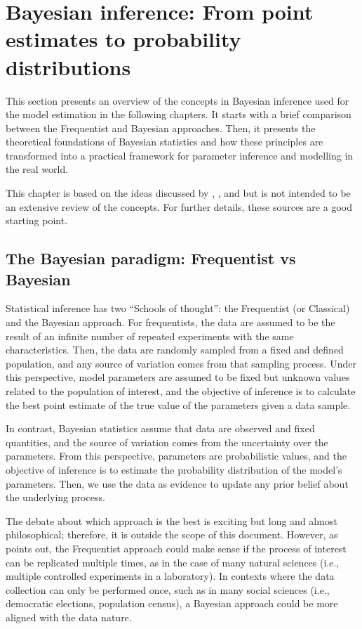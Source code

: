 \chapter{Bayesian inference: From point estimates to probability distributions }\label{chapter:bayesian_inference}

This section presents an overview of the concepts in Bayesian inference used for the model estimation in the following chapters. It starts with a brief comparison between the Frequentist and Bayesian approaches. Then, it presents the theoretical foundations of Bayesian statistics and how these principles are transformed into a practical framework for parameter inference and modelling in the real world. 

This chapter is based on the ideas discussed by \citep{Lambert2018}, \citep{McElreath2016}, and \citep{Gelman2013} but is not intended to be an extensive review of the concepts. For further details, these sources are a good starting point. 

\section{The Bayesian paradigm: Frequentist vs Bayesian} 

Statistical inference has two “Schools of thought”: the Frequentist (or Classical) and the Bayesian approach. For frequentists, the data are assumed to be the result of an infinite number of repeated experiments with the same characteristics.  Then, the data are randomly sampled from a fixed and defined population, and any source of variation comes from that sampling process. Under this perspective, model parameters are assumed to be fixed but unknown values related to the population of interest, and the objective of inference is to calculate the best point estimate of the true value of the parameters given a data sample. 

In contrast, Bayesian statistics assume that data are observed and fixed quantities, and the source of variation comes from the uncertainty over the parameters. From this perspective, parameters are probabilistic values, and the objective of inference is to estimate the probability distribution of the model's parameters. Then, we use the data as evidence to update any prior belief about the underlying process. 

The debate about which approach is the best is exciting but long and almost philosophical; therefore, it is outside the scope of this document. However, as \citep{McElreath2016} points out, the Frequentist approach could make sense if the process of interest can be replicated multiple times, as in the case of many natural sciences (i.e., multiple controlled experiments in a laboratory). In contexts where the data collection can only be performed once, such as in many social sciences (i.e., democratic elections, population census), a Bayesian approach could be more aligned with the data nature. 

